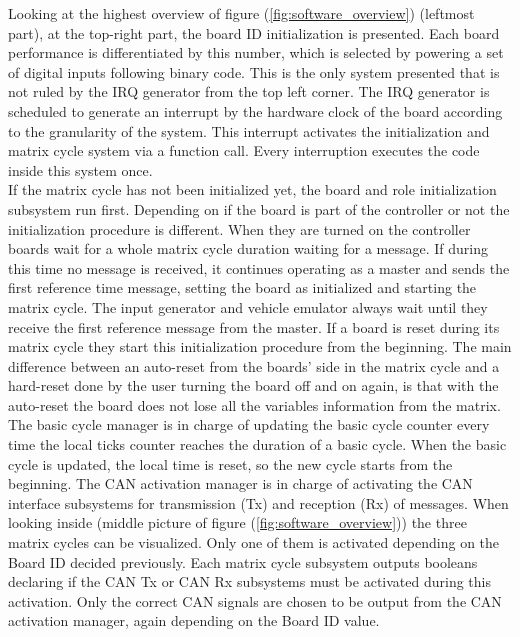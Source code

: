 \documentclass[table,xcdraw]{article}
\begin{document}
Looking at the highest overview of figure (\ref{fig:software_overview}) (leftmost part), at the top-right part, the board ID initialization is presented. Each board performance is differentiated by this number, which is selected by powering a set of digital inputs following binary code. This is the only system presented that is not ruled by the IRQ generator from the top left corner. The IRQ generator is scheduled to generate an interrupt by the hardware clock of the board according to the granularity of the system. This interrupt activates the initialization and matrix cycle system via a function call. Every interruption executes the code inside this system once.\\

If the matrix cycle has not been initialized yet, the board and role initialization subsystem run first. Depending on if the board is part of the controller or not the initialization procedure is different. When they are turned on the controller boards wait for a whole matrix cycle duration waiting for a message. If during this time no message is received, it continues operating as a master and sends the first reference time message, setting the board as initialized and starting the matrix cycle. The input generator and vehicle emulator always wait until they receive the first reference message from the master. If a board is reset during its matrix cycle they start this initialization procedure from the beginning. The main difference between an auto-reset from the boards' side in the matrix cycle and a hard-reset done by the user turning the board off and on again, is that with the auto-reset the board does not lose all the variables information from the matrix.\\

The basic cycle manager is in charge of updating the basic cycle counter every time the local ticks counter reaches the duration of a basic cycle. When the basic cycle is updated, the local time is reset, so the new cycle starts from the beginning. The CAN activation manager is in charge of activating the CAN interface subsystems for transmission (Tx) and reception (Rx) of messages. When looking inside (middle picture of figure (\ref{fig:software_overview})) the three matrix cycles can be visualized. Only one of them is activated depending on the Board ID decided previously. Each matrix cycle subsystem outputs booleans declaring if the CAN Tx or CAN Rx subsystems must be activated during this activation. Only the correct CAN signals are chosen to be output from the CAN activation manager, again depending on the Board ID value.\\
\end{document}
